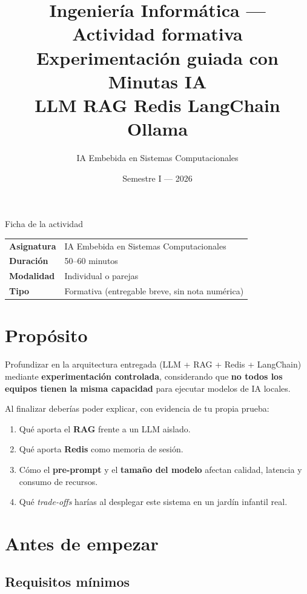 \documentclass[12pt,a4paper]{article}
\title{
  \vspace{-0.8cm}
  {\large Ingeniería Informática --- Actividad formativa}\\[0.4em]
  {\LARGE\bfseries\color{azulprimario}
    Experimentación guiada con Minutas IA}\\[0.3em]
  {\normalsize LLM \textbullet{} RAG \textbullet{} Redis \textbullet{}
   LangChain \textbullet{} Ollama}
}
\author{IA Embebida en Sistemas Computacionales}
\date{Semestre I --- 2026}
\begin{document}
\maketitle
\thispagestyle{fancy}

\begin{infobox}{Ficha de la actividad}
\begin{tabular}{@{}ll@{}}
\toprule
\textbf{Asignatura} & IA Embebida en Sistemas Computacionales \\
\textbf{Duración} & 50--60 minutos \\
\textbf{Modalidad} & Individual o parejas \\
\textbf{Tipo} & Formativa (entregable breve, sin nota numérica) \\
\bottomrule
\end{tabular}
\end{infobox}

\section{Propósito}

Profundizar en la arquitectura entregada (LLM + RAG + Redis + LangChain) mediante
\textbf{experimentación controlada}, considerando que \textbf{no todos los equipos
tienen la misma capacidad} para ejecutar modelos de IA locales.

Al finalizar deberías poder explicar, con evidencia de tu propia prueba:

\begin{enumerate}[noitemsep]
  \item Qué aporta el \textbf{RAG} frente a un LLM aislado.
  \item Qué aporta \textbf{Redis} como memoria de sesión.
  \item Cómo el \textbf{pre-prompt} y el \textbf{tamaño del modelo} afectan
        calidad, latencia y consumo de recursos.
  \item Qué \textit{trade-offs} harías al desplegar este sistema en un jardín
        infantil real.
\end{enumerate}

\section{Antes de empezar}

\subsection{Requisitos mínimos}
\end{document}
